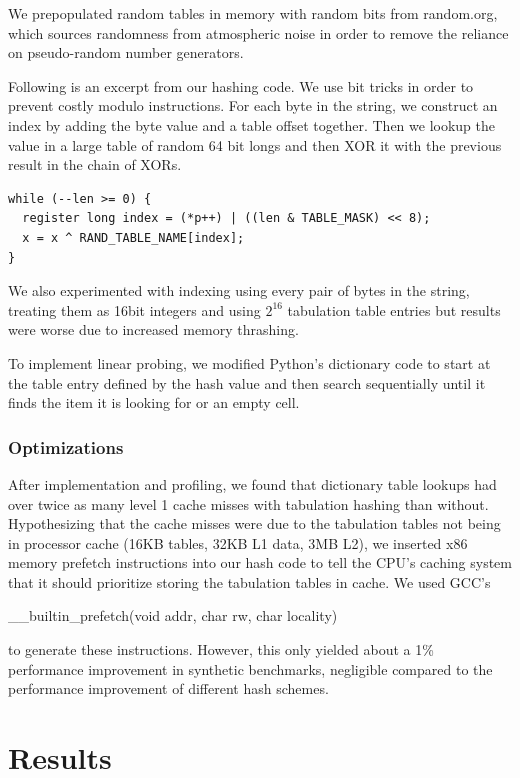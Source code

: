 \documentclass[runningheads,a4paper]{llncs}
\begin{document}
We prepopulated random tables in memory with random bits from random.org, which
sources randomness from atmospheric noise in order to remove the reliance on
pseudo-random number generators.

Following is an excerpt from our hashing code.  We use bit tricks in
order to prevent costly modulo instructions.  For each byte in the
string, we construct an index by adding the byte value and a table offset
together.  Then we lookup the value in a large table of random 64 bit
longs and then XOR it with the previous result in the chain of XORs.

\begin{verbatim}
while (--len >= 0) {
  register long index = (*p++) | ((len & TABLE_MASK) << 8);
  x = x ^ RAND_TABLE_NAME[index];
}
\end{verbatim}

We also experimented with indexing using every pair of bytes in the string,
treating them as 16bit integers and
using $2^{16}$ tabulation table entries but results were worse due to increased memory thrashing.

To implement linear probing, we modified Python's dictionary code to start at
the table entry defined by the hash value and then search sequentially until it
finds the item it is looking for or an empty cell.

\subsubsection{Optimizations}

After implementation and profiling, we found that dictionary table lookups had
over twice as many level 1 cache misses with tabulation hashing than without.
Hypothesizing that the cache misses were due to the tabulation tables not being in processor cache (16KB tables, 32KB L1 data, 3MB L2), we inserted x86 memory prefetch
instructions into our hash code to tell the CPU's caching system that it should
prioritize storing the tabulation tables in cache.  We used GCC's
\begin{tt}\_\_builtin\_prefetch(void \*addr, char rw, char locality)\end{tt} \cite{prefetch}
to generate these instructions.  However, this only yielded about a 1\% performance improvement in synthetic benchmarks,
negligible compared to the performance improvement of different hash schemes.

\section{Results}
\end{document}
